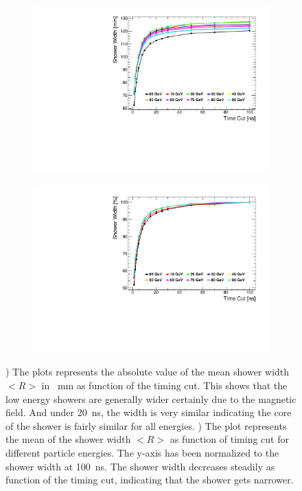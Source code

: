 \begin{figure}[htbp!]
  \centering
  \begin{subfigure}[t]{0.49\textwidth}
    \centering
    \includegraphics[width=1\linewidth]{../Thesis_Plots/ILD/NoSmearing/Plots/ShowerWidthAbso_TimeCuts_noSmearing}
    \caption{} \label{fig:ShowerWidthAbsoNoSmearing}
  \end{subfigure}
  \begin{subfigure}[t]{0.49\textwidth}
    \centering
    \includegraphics[width=1\linewidth]{../Thesis_Plots/ILD/NoSmearing/Plots/ShowerWidth_TimeCuts_noSmearing}
    \caption{} \label{fig:ShowerWidthNoSmearing}
  \end{subfigure}
  \caption{) The plots represents the absolute value of the mean shower width $<R>$ in \SI{}{\milli\meter} as function of the timing cut. This shows that the low energy showers are generally wider certainly due to the magnetic field. And under \SI{20}{\nano\second}, the width is very similar indicating the core of the shower is fairly similar for all energies. ) The plot represents the mean of the shower width $<R>$ as function of timing cut for different particle energies. The y-axis has been normalized to the shower width at \SI{100}{\nano\second}. The shower width decreases steadily as function of the timing cut, indicating that the shower gets narrower.}
\end{figure}

